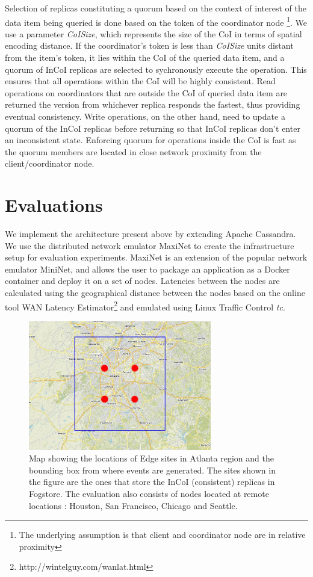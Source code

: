 Selection of replicas constituting a quorum based on the context of interest of the data item being queried is done based on the token of the coordinator node \footnote{The underlying assumption is that client and coordinator node are in relative proximity}. We use a parameter \emph{CoISize}, which represents the size of the CoI in terms of spatial encoding distance.  If the coordinator's token is less than \emph{CoISize} units distant from the item's token, it lies within the CoI of the queried data item, and a quorum of InCoI replicas are selected to sychronously execute the operation. This ensures that all operations within the CoI will be highly consistent. Read operations on coordinators that are outside the CoI of queried data item are returned the version from whichever replica responds the fastest, thus providing eventual consistency. Write operations, on the other hand, need to update a quorum of the InCoI replicas before returning so that InCoI replicas don't enter an inconsistent state. Enforcing quorum for operations inside the CoI is fast as the quorum members are located in close network proximity from the client/coordinator node.

\section{Evaluations}
\label{sec:evals}
We implement the architecture present above by extending Apache Cassandra. We use the distributed network emulator MaxiNet \cite{maxinet} to create the infrastructure setup for evaluation experiments. MaxiNet is an extension of the popular network emulator MiniNet, and allows the user to package an application as a Docker container and deploy it on a set of nodes. Latencies between the nodes are calculated using the geographical distance between the nodes based on the online tool WAN Latency Estimator\footnote{http://wintelguy.com/wanlat.html} and emulated using Linux Traffic Control \textit{tc}.

\begin{figure}[h]
\centering
\includegraphics[width=8cm]{figures/fogstore/evals/hotspot/map-cropped.jpg}
\caption{Map showing the locations of Edge sites in Atlanta region and the bounding box from where events are generated. The sites shown in the figure are the ones that store the InCoI (consistent) replicas in Fogstore. The evaluation also consists of nodes located at remote locations : Houston, San Francisco, Chicago and Seattle.}
\label{fig:hotspotmap}
\end{figure}

